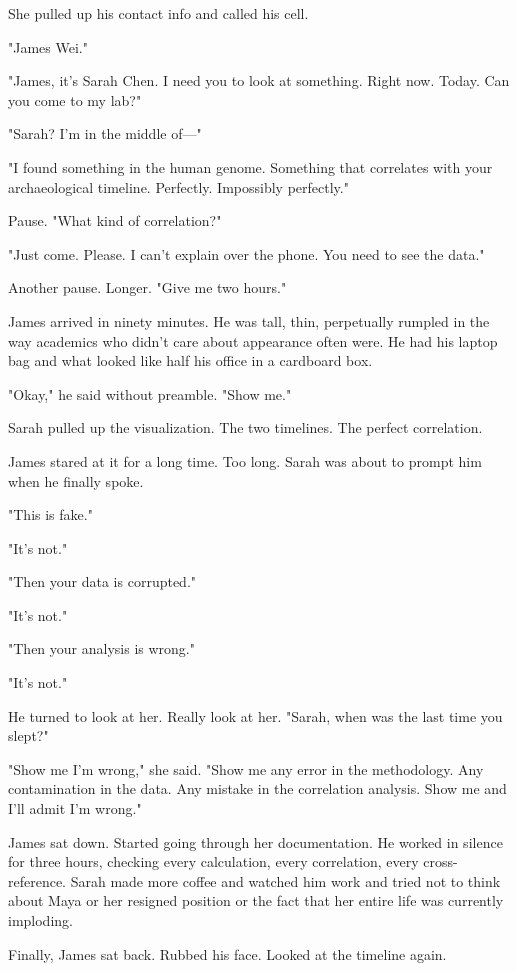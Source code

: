She pulled up his contact info and called his cell.

"James Wei."

"James, it's Sarah Chen. I need you to look at something. Right now. Today. Can you come to my lab?"

"Sarah? I'm in the middle of—"

"I found something in the human genome. Something that correlates with your archaeological timeline. Perfectly. Impossibly perfectly."

Pause. "What kind of correlation?"

"Just come. Please. I can't explain over the phone. You need to see the data."

Another pause. Longer. "Give me two hours."

\scenebreak

James arrived in ninety minutes. He was tall, thin, perpetually rumpled in the way academics who didn't care about appearance often were. He had his laptop bag and what looked like half his office in a cardboard box.

"Okay," he said without preamble. "Show me."

Sarah pulled up the visualization. The two timelines. The perfect correlation.

James stared at it for a long time. Too long. Sarah was about to prompt him when he finally spoke.

"This is fake."

"It's not."

"Then your data is corrupted."

"It's not."

"Then your analysis is wrong."

"It's not."

He turned to look at her. Really look at her. "Sarah, when was the last time you slept?"

"Show me I'm wrong," she said. "Show me any error in the methodology. Any contamination in the data. Any mistake in the correlation analysis. Show me and I'll admit I'm wrong."

James sat down. Started going through her documentation. He worked in silence for three hours, checking every calculation, every correlation, every cross-reference. Sarah made more coffee and watched him work and tried not to think about Maya or her resigned position or the fact that her entire life was currently imploding.

Finally, James sat back. Rubbed his face. Looked at the timeline again.

